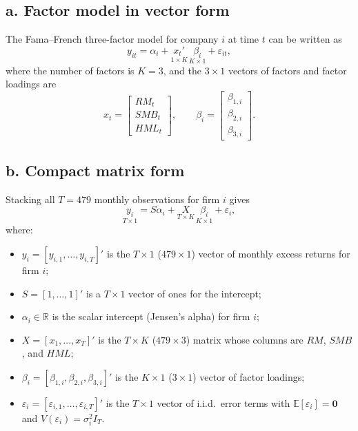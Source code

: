 \documentclass[11pt,a4paper]{article}
\begin{document}
\subsection*{a. Factor model in vector form}
The Fama--French three-factor model for company $i$ at time $t$ can be written as
\begin{equation*}
    y_{it} = \alpha_i + \underset{1 \times K}{x_t'} \, \underset{K \times 1}{\beta_i} + \varepsilon_{it},
\end{equation*}
where the number of factors is $K = 3$, and the $3 \times 1$ vectors of factors and factor loadings are
\begin{equation*}
    x_t = \begin{bmatrix} RM_t \\ SMB_t \\ HML_t \end{bmatrix}, \qquad
    \beta_i = \begin{bmatrix} \beta_{1,i} \\ \beta_{2,i} \\ \beta_{3,i} \end{bmatrix}.
\end{equation*}

\subsection*{b. Compact matrix form}
Stacking all $T = 479$ monthly observations for firm $i$ gives
\begin{equation*}
    \underset{T \times 1}{y_i} = S\alpha_i + \underset{T \times K}{X} \, \underset{K \times 1}{\beta_i} + \varepsilon_i,
\end{equation*}
where:
\begin{itemize}
    \item $y_i = [y_{i,1}, \dots, y_{i,T}]'$ is the $T \times 1$ ($479 \times 1$) vector of monthly excess returns for firm $i$;
    \item $S = [1, \dots, 1]'$ is a $T \times 1$ vector of ones for the intercept;
    \item $\alpha_i \in \mathbb{R}$ is the scalar intercept (Jensen's alpha) for firm $i$;
    \item $X = [x_1, \dots, x_T]'$ is the $T \times K$ ($479 \times 3$) matrix whose columns are $RM$, $SMB$, and $HML$;
    \item $\beta_i = [\beta_{1,i}, \beta_{2,i}, \beta_{3,i}]'$ is the $K \times 1$ ($3 \times 1$) vector of factor loadings;
    \item $\varepsilon_i = [\varepsilon_{i,1}, \dots, \varepsilon_{i,T}]'$ is the $T \times 1$ vector of i.i.d.\ error terms with $\mathbb{E}[\varepsilon_i] = \mathbf{0}$ and $V(\varepsilon_i) = \sigma_i^2 I_T$.
\end{itemize}
\end{document}
